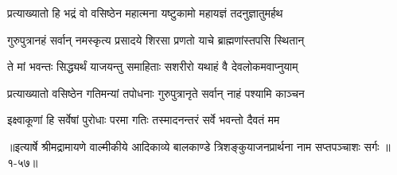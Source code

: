 \twolineshloka
{प्रत्याख्यातो हि भद्रं वो वसिष्ठेन महात्मना}
{यष्टुकामो महायज्ञं तदनुज्ञातुमर्हथ} %

\twolineshloka
{गुरुपुत्रानहं सर्वान् नमस्कृत्य प्रसादये}
{शिरसा प्रणतो याचे ब्राह्मणांस्तपसि स्थितान्} %

\twolineshloka
{ते मां भवन्तः सिद्ध्यर्थं याजयन्तु समाहिताः}
{सशरीरो यथाहं वै देवलोकमवाप्नुयाम्} %

\twolineshloka
{प्रत्याख्यातो वसिष्ठेन गतिमन्यां तपोधनाः}
{गुरुपुत्रानृते सर्वान् नाहं पश्यामि काञ्चन} %

\twolineshloka
{इक्ष्वाकूणां हि सर्वेषां पुरोधाः परमा गतिः}
{तस्मादनन्तरं सर्वे भवन्तो दैवतं मम} %


॥इत्यार्षे श्रीमद्रामायणे वाल्मीकीये आदिकाव्ये बालकाण्डे त्रिशङ्कुयाजनप्रार्थना नाम सप्तपञ्चाशः सर्गः ॥१-५७॥
